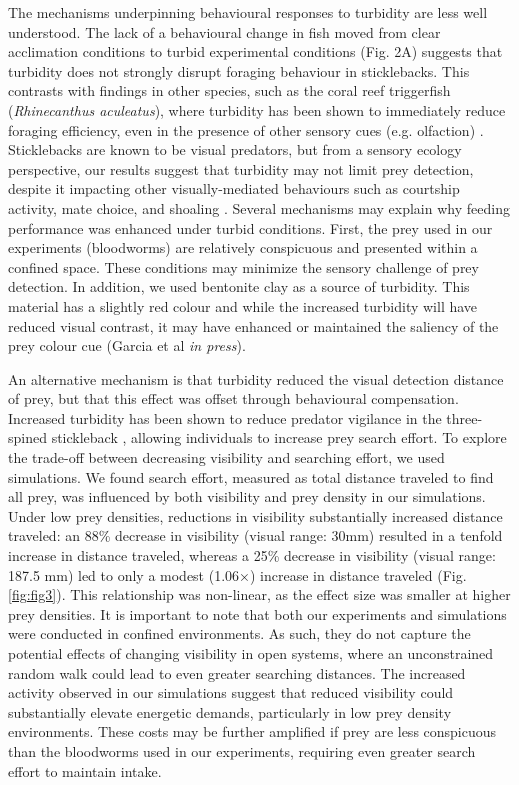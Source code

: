 \documentclass[ASNA,twocolumn]{USG} %
\begin{document}
The mechanisms underpinning behavioural responses to turbidity are less well understood. The lack of a behavioural change in fish moved from clear acclimation conditions to turbid experimental conditions (Fig. 2A) suggests that turbidity does not strongly disrupt foraging behaviour in sticklebacks. This contrasts with findings in other species, such as the coral reef triggerfish (\textit{Rhinecanthus aculeatus}), where turbidity has been shown to immediately reduce foraging efficiency, even in the presence of other sensory cues (e.g. olfaction) \citep{newportHighTurbidityLevels2021, rodriguesMetaanalyticalReviewTurbidity2023}. Sticklebacks are known to be visual predators, but from a sensory ecology perspective, our results suggest that turbidity may not limit prey detection, despite it impacting other visually-mediated behaviours such as courtship activity, mate choice, and shoaling \citep{candolinChangedEnvironmentalConditions2007, engstrom-ostHumaninducedWaterTurbidity2007,heuscheleEnvironmentdependentUseMate2009}. Several mechanisms may explain why feeding performance was enhanced under turbid conditions. First, the prey used in our experiments (bloodworms) are relatively conspicuous and presented within a confined space. These conditions may minimize the sensory challenge of prey detection. In addition, we used bentonite clay as a source of turbidity. This material has a slightly red colour and while the increased turbidity will have reduced visual contrast, it may have enhanced or maintained the saliency of the prey colour cue (Garcia et al \textit{in press}). 

An alternative mechanism is that turbidity reduced the visual detection distance of prey, but that this effect was offset through behavioural compensation. Increased turbidity has been shown to reduce predator vigilance in the three-spined stickleback \citep{sohelAlgalTurbidityReduces2015}, allowing individuals to increase prey search effort. To explore the trade-off between decreasing visibility and searching effort, we used simulations. We found search effort, measured as total distance traveled to find all prey, was influenced by both visibility and prey density in our simulations. Under low prey densities, reductions in visibility substantially increased distance traveled: an 88\% decrease in visibility (visual range: 30mm) resulted in a tenfold increase in distance traveled, whereas a 25\% decrease in visibility (visual range: 187.5 mm) led to only a modest (1.06×) increase in distance traveled (Fig. \ref{fig:fig3}). This relationship was non-linear, as the effect size was smaller at higher prey densities. It is important to note that both our experiments and simulations were conducted in confined environments. As such, they do not capture the potential effects of changing visibility in open systems, where an unconstrained random walk could lead to even greater searching distances. The increased activity observed in our simulations suggest that reduced visibility could substantially elevate energetic demands, particularly in low prey density environments. These costs may be further amplified if prey are less conspicuous than the bloodworms used in our experiments, requiring even greater search effort to maintain intake.
\end{document}
